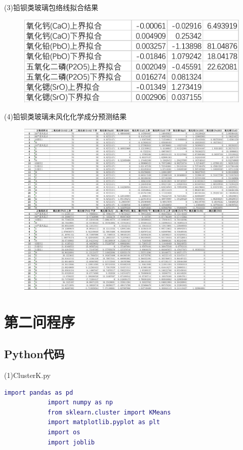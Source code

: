 \documentclass[withoutpreface,bwprint]{cumcmthesis}
\begin{document}
\begin{appendices}
		(3)铅钡类玻璃包络线拟合结果
		
		\begin{figure}[H]
			\centering
			\includegraphics{铅钡包络拟合}
		\end{figure}

		(4)铅钡类玻璃未风化化学成分预测结果

		\begin{figure}[H]
			\centering
			\includegraphics[width=\textwidth]{铅钡类成分预测}
		\end{figure}
  
		\section{第二问程序}

		\subsection{Python代码}

		(1)ClusterK.py 
		\begin{lstlisting}[language=MATLAB]
			import pandas as pd
			import numpy as np
			from sklearn.cluster import KMeans
			import matplotlib.pyplot as plt
			import os
			import joblib
			

\end{lstlisting}
\end{appendices}
\end{document}
